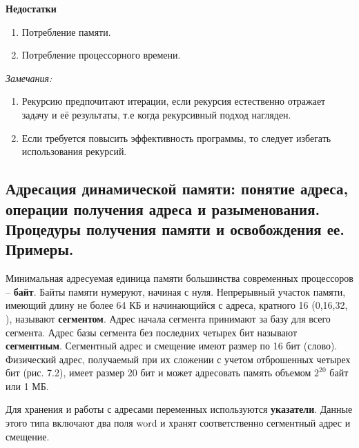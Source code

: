 {\bf Недостатки}
\begin{enumerate}
\item Потребление памяти. 
\item Потребление процессорного времени.
\end{enumerate}

{\textit {Замечания:}}
\begin{enumerate}
\item Рекурсию предпочитают итерации, если рекурсия естественно отражает задачу и её результаты, т.е когда рекурсивный подход нагляден.
\item Если требуется повысить эффективность программы, то следует избегать использования рекурсий.
\end{enumerate}








\newpage\subsection{Адресация динамической памяти: понятие адреса, операции получения адреса и разыменования. Процедуры получения памяти и освобождения ее. Примеры. }

\begin{myquote}
            
\end{myquote}

Минимальная адресуемая единица памяти большинства современных процессоров – {\bf байт}. Байты памяти нумеруют, начиная с нуля.
Непрерывный участок памяти, имеющий длину не более 64 КБ и начинающийся с адреса, кратного 16 (0,16,32, ), называют {\bf сегментом}. Адрес начала сегмента принимают за базу для всего сегмента. Адрес базы сегмента без последних четырех бит называют {\bf сегментным}. 
Сегментный адрес и смещение имеют размер по 16 бит (слово). Физический адрес, получаемый при их сложении с учетом отброшенных четырех 
бит (рис. 7.2), имеет размер 20 бит и может адресовать память объемом $2^{20}$ байт или 1 МБ.


Для хранения и работы с адресами переменных используются {\bf{указатели}}. Данные этого типа включают два поля word и хранят соответственно сегментный адрес и смещение.

